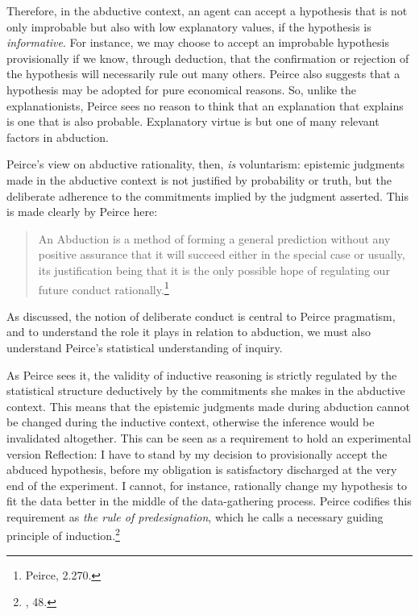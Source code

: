 Therefore, in the abductive context, an agent can accept a hypothesis
that is not only improbable but also with low explanatory values, if the
hypothesis is \emph{informative}. For instance, we may choose to accept
an improbable hypothesis provisionally if we know, through deduction,
that the confirmation or rejection of the hypothesis will necessarily
rule out many others. Peirce also suggests that a hypothesis may be
adopted for pure economical reasons. So, unlike the explanationists,
Peirce sees no reason to think that an explanation that explains is one
that is also probable. Explanatory virtue is but one of many relevant
factors in abduction.

Peirce's view on abductive rationality, then, \emph{is} voluntarism:
epistemic judgments made in the abductive context is not justified by
probability or truth, but the deliberate adherence to the commitments
implied by the judgment asserted. This is made clearly by Peirce here:

\begin{quote}
An Abduction is a method of forming a general prediction without any
positive assurance that it will succeed either in the special case or
usually, its justification being that it is the only possible hope of
regulating our future conduct rationally.\footnote{Peirce, 2.270.}
\end{quote}

As discussed, the notion of deliberate conduct is central to Peirce
pragmatism, and to understand the role it plays in relation to
abduction, we must also understand Peirce's statistical understanding of
inquiry.

As Peirce sees it, the validity of inductive reasoning is strictly
regulated by the statistical structure deductively by the commitments
she makes in the abductive context. This means that the epistemic
judgments made during abduction cannot be changed during the inductive
context, otherwise the inference would be invalidated altogether. This
can be seen as a requirement to hold an experimental version Reflection:
I have to stand by my decision to provisionally accept the abduced
hypothesis, before my obligation is satisfactory discharged at the very
end of the experiment. I cannot, for instance, rationally change my
hypothesis to fit the data better in the middle of the data-gathering
process. Peirce codifies this requirement as \emph{the rule of
predesignation}, which he calls a necessary guiding principle of
induction.\footnote{\cite{essentialpeirce2}, 48.}

